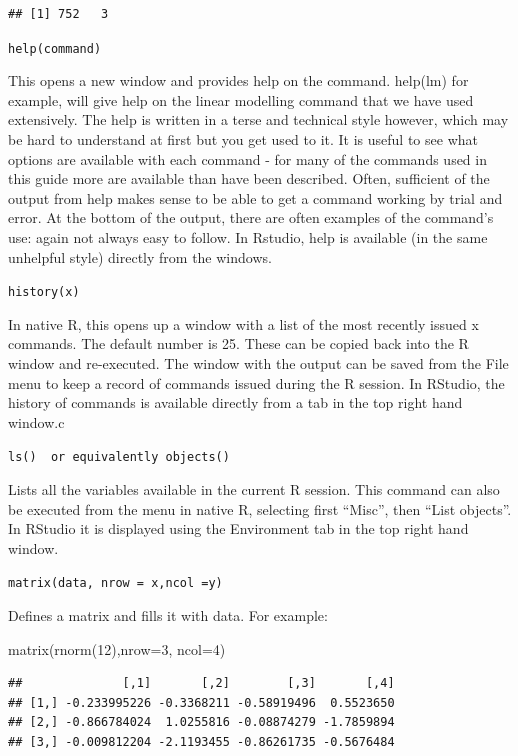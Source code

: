 \documentclass[
]{book}
\newenvironment{Shaded}{\begin{snugshade}}{\end{snugshade}}
\newcommand{\AttributeTok}[1]{\textcolor[rgb]{0.77,0.63,0.00}{#1}}
\newcommand{\DecValTok}[1]{\textcolor[rgb]{0.00,0.00,0.81}{#1}}
\newcommand{\FunctionTok}[1]{\textcolor[rgb]{0.00,0.00,0.00}{#1}}
\newcommand{\NormalTok}[1]{#1}
\begin{document}
\begin{verbatim}
## [1] 752   3
\end{verbatim}

\texttt{help(command)}

This opens a new window and provides help on the command. help(lm) for example, will give help on the linear modelling command that we have used extensively. The help is written in a terse and technical style however, which may be hard to understand at first but you get used to it. It is useful to see what options are available with each command - for many of the commands used in this guide more are available than have been described. Often, sufficient of the output from help makes sense to be able to get a command working by trial and error. At the bottom of the output, there are often examples of the command's use: again not always easy to follow. In Rstudio, help is available (in the same unhelpful style) directly from the windows.

\texttt{history(x)}

In native R, this opens up a window with a list of the most recently issued x commands. The default number is 25. These can be copied back into the R window and re-executed. The window with the output can be saved from the File menu to keep a record of commands issued during the R session. In RStudio, the history of commands is available directly from a tab in the top right hand window.c

\texttt{ls()\ \ or\ equivalently\ objects()}

Lists all the variables available in the current R session. This command can also be executed from the menu in native R, selecting first ``Misc'', then ``List objects''. In RStudio it is displayed using the Environment tab in the top right hand window.

\texttt{matrix(data,\ nrow\ =\ x,ncol\ =y)}

Defines a matrix and fills it with data. For example:

\begin{Shaded}
\begin{Highlighting}[]
\FunctionTok{matrix}\NormalTok{(}\FunctionTok{rnorm}\NormalTok{(}\DecValTok{12}\NormalTok{),}\AttributeTok{nrow=}\DecValTok{3}\NormalTok{, }\AttributeTok{ncol=}\DecValTok{4}\NormalTok{)}
\end{Highlighting}
\end{Shaded}

\begin{verbatim}
##              [,1]       [,2]        [,3]       [,4]
## [1,] -0.233995226 -0.3368211 -0.58919496  0.5523650
## [2,] -0.866784024  1.0255816 -0.08874279 -1.7859894
## [3,] -0.009812204 -2.1193455 -0.86261735 -0.5676484
\end{verbatim}
\end{document}
